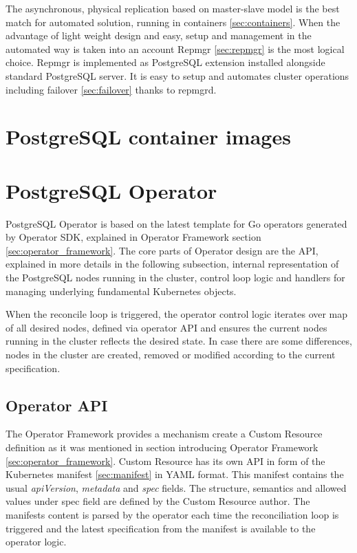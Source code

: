 \documentclass[
  digital, %
  twoside, %
  table,   %
  lof,     %
  lot,     %
]{fithesis3}
\begin{document}
The asynchronous, physical replication based on master-slave model is the best match for automated solution, running in containers \ref{sec:containers}. When the advantage of light weight design and easy, setup and management in the automated way is taken into an account Repmgr \ref{sec:repmgr} is the most logical choice. Repmgr is implemented as PostgreSQL extension installed alongside standard PostgreSQL server. It is easy to setup and automates cluster operations including failover \ref{sec:failover} thanks to repmgrd.

\section{PostgreSQL container images}

\section{PostgreSQL Operator}
PostgreSQL Operator is based on the latest template for Go operators generated by Operator SDK, explained in Operator Framework section \ref{sec:operator_framework}. The core parts of Operator design are the API, explained in more details in the following subsection, internal representation of the PostgreSQL nodes running in the cluster, control loop logic and handlers for managing underlying fundamental Kubernetes objects.

When the reconcile loop is triggered, the operator control logic iterates over map of all desired nodes, defined via operator API and ensures the current nodes running in the cluster reflects the desired state. In case there are some differences, nodes in the cluster are created, removed or modified according to the current specification.

\subsection{Operator API} \label{sec:operator_api}
The Operator Framework provides a mechanism create a Custom Resource definition as it was mentioned in section introducing Operator Framework \ref{sec:operator_framework}. Custom Resource has its own API in form of the Kubernetes manifest \ref{sec:manifest} in YAML format. This manifest contains the usual \textit{apiVersion}, \textit{metadata} and \textit{spec} fields. The structure, semantics and allowed values under spec field are defined by the Custom Resource author. The manifests content is parsed by the operator each time the reconciliation loop is triggered and the latest specification from the manifest is available to the operator logic.
\end{document}
